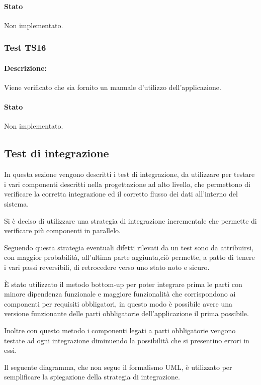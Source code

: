 \documentclass[../PianoDiQualifica.tex]{subfiles}
\begin{document}
	\paragraph{Stato} Non implementato.
	
	\subsubsection{Test TS16} 
	\paragraph{Descrizione:} Viene verificato che sia fornito un manuale d'utilizzo dell'applicazione.
	\paragraph{Stato} Non implementato.
	
	
	\subsection{Test di integrazione} 
	In questa sezione vengono descritti i test di integrazione, da utilizzare per testare i vari componenti descritti nella progettazione ad alto livello, che permettono di verificare la corretta integrazione ed il corretto flusso dei dati all'interno del sistema.
	
	Si è deciso di utilizzare una strategia di integrazione incrementale che permette di verificare più componenti in parallelo.
	
	Seguendo questa strategia eventuali difetti rilevati da un test sono da attribuirsi, con maggior probabilità, all’ultima parte aggiunta,ciò permette, a patto di tenere i vari passi reversibili, di retrocedere verso uno stato noto e sicuro.
	
	È stato utilizzato il metodo bottom-up per poter integrare prima le parti con minore dipendenza funzionale e maggiore funzionalità che corrispondono ai componenti per requisiti obbligatori, in questo modo è possibile avere una versione funzionante delle parti obbligatorie dell’applicazione il prima possibile.
	
	Inoltre con questo metodo i componenti legati a parti obbligatorie vengono testate ad ogni integrazione diminuendo la possibilità che si presentino errori in essi.
	
	Il seguente diagramma, che non segue il formalismo UML, è utilizzato per semplificare la spiegazione della strategia di integrazione.
	
\end{document}
